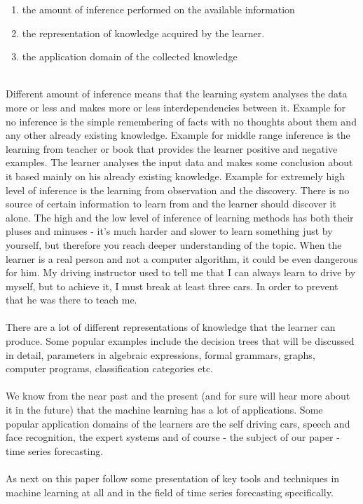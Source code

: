 \documentclass[runningheads,a4paper]{llncs}[2015/06/24]
\begin{document}
\begin{enumerate}
\item the amount of inference performed on the available information
\item the representation of knowledge acquired by the learner. 
\item the application domain of the collected knowledge 
\end{enumerate}\hspace{1cm}\\Different amount of inference means that the learning system analyses the data more or less and makes more or less interdependencies between it. Example for no inference is the simple remembering of facts with no thoughts about them and any other already existing knowledge. Example for middle range inference is the learning from teacher or book that provides the learner positive and negative examples. The learner analyses the input data and makes some conclusion about it based mainly on his already existing knowledge. Example for extremely high level of inference is the learning from observation and the discovery. There is no source of certain information to learn from and the learner should discover it alone\cite{Michalski1983}. The high and the low level of inference of learning methods has both their pluses and minuses - it's much harder and slower to learn something just by yourself, but therefore you reach deeper understanding of the topic. When the learner is a real person and not a computer algorithm, it could be even dangerous for him. My driving instructor used to tell me that I can always learn to drive by myself, but to achieve it, I must break at least three cars. In order to prevent that he was there to teach me.\\\\
There are a lot of different representations of knowledge that the learner can produce. Some popular examples include the decision trees that will be discussed in detail, parameters in algebraic expressions, formal grammars, graphs, computer programs, classification categories etc.\\\\
We know from the near past and the present  (and for sure will hear more about it in the future) that the machine learning has a lot of applications. Some popular application domains of the learners are the self driving cars, speech and face recognition, the expert systems and of course - the subject of our paper - time series forecasting.  \\\\As next on this paper follow some presentation of key tools and techniques in machine learning at all and in the field of time series forecasting specifically.
				
\end{document}
